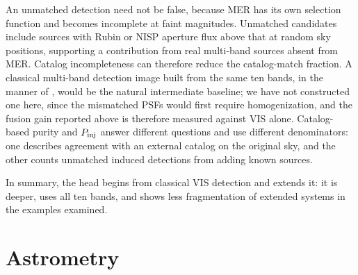 \documentclass[twocolumn,linenumbers]{aastex701}
\begin{document}
An unmatched detection need not be false, because MER has its own selection function and becomes incomplete at faint magnitudes. Unmatched candidates include sources with Rubin or NISP aperture flux above that at random sky positions, supporting a contribution from real multi-band sources absent from MER. Catalog incompleteness can therefore reduce the catalog-match fraction. A classical multi-band detection image built from the same ten bands, in the manner of \citet{Szalay1999}, would be the natural intermediate baseline; we have not constructed one here, since the mismatched PSFs would first require homogenization, and the fusion gain reported above is therefore measured against VIS alone. Catalog-based purity and $P_{\rm inj}$ answer different questions and use different denominators: one describes agreement with an external catalog on the original sky, and the other counts unmatched induced detections from adding known sources.

In summary, the head begins from classical VIS detection and extends it: it is deeper, uses all ten bands, and shows less fragmentation of extended systems in the examples examined.

\section{Astrometry}\label{sec:astrometry}
\end{document}
